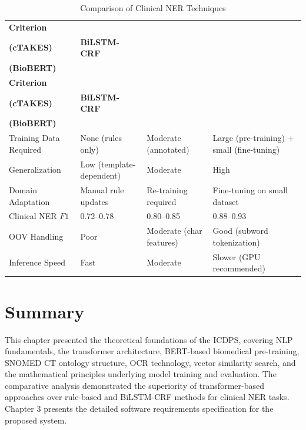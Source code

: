 \begin{longtable}{|p{3cm}|p{3.65cm}|p{3.75cm}|p{3.8cm}|}

\caption{Comparison of Clinical NER Techniques}
\label{tab:ner_techniques_comparison} \\

\hline

\textbf{Criterion} &
\shortstack{\textbf{Rule-Based}\\\textbf{(cTAKES)}} &
\textbf{BiLSTM-CRF} &
\shortstack{\textbf{Transformer}\\\textbf{(BioBERT)}} \\

\hline
\endfirsthead

\hline

\textbf{Criterion} &
\shortstack{\textbf{Rule-Based}\\\textbf{(cTAKES)}} &
\textbf{BiLSTM-CRF} &
\shortstack{\textbf{Transformer}\\\textbf{(BioBERT)}} \\

\hline
\endhead

Training Data Required &
None (rules only) &
Moderate (annotated) &
Large (pre-training) + small (fine-tuning) \\

\hline

Generalization &
Low (template-dependent) &
Moderate &
High \\

\hline

Domain Adaptation &
Manual rule updates &
Re-training required &
Fine-tuning on small dataset \\

\hline

Clinical NER $F1$ &
0.72--0.78 &
0.80--0.85 &
0.88--0.93 \\

\hline

OOV Handling &
Poor &
Moderate (char features) &
Good (subword tokenization) \\

\hline

Inference Speed &
Fast &
Moderate &
Slower (GPU recommended) \\

\hline

\end{longtable}

\section*{Summary}
This chapter presented the theoretical foundations of the ICDPS, covering NLP fundamentals, the transformer architecture, BERT-based biomedical pre-training, SNOMED CT ontology structure, OCR technology, vector similarity search, and the mathematical principles underlying model training and evaluation. The comparative analysis demonstrated the superiority of transformer-based approaches over rule-based and BiLSTM-CRF methods for clinical NER tasks. Chapter 3 presents the detailed software requirements specification for the proposed system.
